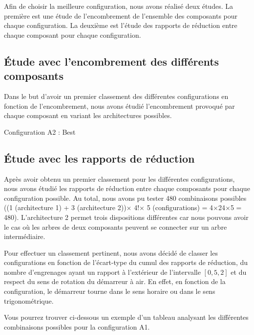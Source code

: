 \documentclass{config}
\begin{document}
\begin{spacing}{1.2}
Afin de choisir la meilleure configuration, nous avons réalisé deux études. La première est une étude de l'encombrement de l'ensemble des composants pour chaque configuration. La deuxième est  l'étude des rapports de réduction entre chaque composant pour chaque configuration.

\newpage
\subsection{Étude avec l'encombrement des différents composants}
Dans le but d'avoir un premier classement des différentes configurations en fonction de l'encombrement, nous avons étudié l'encombrement provoqué par chaque composant en variant les architectures possibles. 


Configuration A2 : Best
\newpage
\subsection{Étude avec les rapports de réduction}

Après avoir obtenu un premier classement pour les différentes configurations, nous avons étudié les rapports de réduction entre chaque composants pour chaque configuration possible. Au total, nous avons pu tester 480 combinaisons possibles ((1 (architecture 1) + 3 (architecture 2))$\times$ 4!$\times$ 5 (configurations) = 4$\times$24$\times$5 = 480). L'architecture 2 permet trois dispositions différentes car nous pouvons avoir le cas où les arbres de deux composants peuvent se connecter sur un arbre intermédiaire.

Pour effectuer un classement pertinent, nous avons décidé de classer les configurations en fonction de l'écart-type du cumul des rapports de réduction, du nombre d'engrenages ayant un rapport à l'extérieur de l'intervalle $[0,5,2]$ et du respect du sens de rotation du démarreur à air. En effet, en fonction de la configuration, le démarreur tourne dans le sens horaire ou dans le sens trigonométrique.

Vous pourrez trouver ci-dessous un exemple d'un tableau analysant les différentes combinaisons possibles pour la configuration A1.


\end{spacing}
\end{document}
